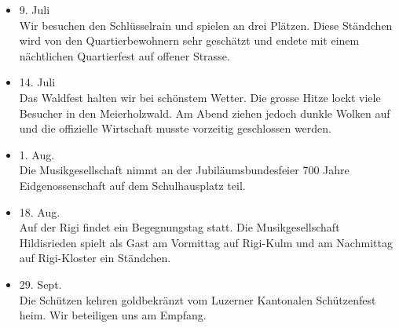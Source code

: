 \begin{history}
\begin{itemize}
            \item 9. Juli\\
                  Wir besuchen den Schlüsselrain und spielen an drei Plätzen.
                  Diese Ständchen wird von den Quartierbewohnern sehr geschätzt
                  und endete mit einem nächtlichen Quartierfest auf offener
                  Strasse.

            \item 14. Juli\\
                  Das Waldfest halten wir bei schönstem Wetter. Die grosse Hitze
                  lockt viele Besucher in den Meierholzwald. Am Abend ziehen
                  jedoch dunkle Wolken auf und die offizielle Wirtschaft musste
                  vorzeitig geschlossen werden.

            \item 1. Aug.\\
                  Die Musikgesellschaft nimmt an der Jubiläumsbundesfeier 700
                  Jahre Eidgenossenschaft auf dem Schulhausplatz teil.

            \item 18. Aug.\\
                  Auf der Rigi findet ein Begegnungstag statt. Die
                  Musikgesellschaft Hildisrieden spielt als Gast am Vormittag
                  auf Rigi-Kulm und am Nachmittag auf Rigi-Kloster ein
                  Ständchen.

            \item 29. Sept.\\
                  Die Schützen kehren goldbekränzt vom Luzerner Kantonalen
                  Schützenfest heim. Wir beteiligen uns am Empfang.

      \end{itemize}

\end{history}
